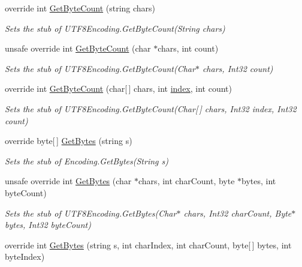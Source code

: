 \begin{DoxyCompactItemize}
override int \hyperlink{class_system_1_1_text_1_1_fakes_1_1_stub_u_t_f8_encoding_acc1ef50c69cc9d464629e328cd5be619}{Get\-Byte\-Count} (string chars)
\begin{DoxyCompactList}\small\item\em Sets the stub of U\-T\-F8\-Encoding.\-Get\-Byte\-Count(\-String chars)\end{DoxyCompactList}\item 
unsafe override int \hyperlink{class_system_1_1_text_1_1_fakes_1_1_stub_u_t_f8_encoding_ab419956e8c4b9d27339d304470aca6c3}{Get\-Byte\-Count} (char $\ast$chars, int count)
\begin{DoxyCompactList}\small\item\em Sets the stub of U\-T\-F8\-Encoding.\-Get\-Byte\-Count(\-Char$\ast$ chars, Int32 count)\end{DoxyCompactList}\item 
override int \hyperlink{class_system_1_1_text_1_1_fakes_1_1_stub_u_t_f8_encoding_a3588dd842f7aef5383732c38241709fd}{Get\-Byte\-Count} (char\mbox{[}$\,$\mbox{]} chars, int \hyperlink{jquery-1_810_82-vsdoc_8js_a75bb12d1f23302a9eea93a6d89d0193e}{index}, int count)
\begin{DoxyCompactList}\small\item\em Sets the stub of U\-T\-F8\-Encoding.\-Get\-Byte\-Count(\-Char\mbox{[}$\,$\mbox{]} chars, Int32 index, Int32 count)\end{DoxyCompactList}\item 
override byte\mbox{[}$\,$\mbox{]} \hyperlink{class_system_1_1_text_1_1_fakes_1_1_stub_u_t_f8_encoding_af7c82dad16ce5d06b27e93c56b20d840}{Get\-Bytes} (string s)
\begin{DoxyCompactList}\small\item\em Sets the stub of Encoding.\-Get\-Bytes(\-String s)\end{DoxyCompactList}\item 
unsafe override int \hyperlink{class_system_1_1_text_1_1_fakes_1_1_stub_u_t_f8_encoding_aab27459e593d68b0ff01a9796c0207bf}{Get\-Bytes} (char $\ast$chars, int char\-Count, byte $\ast$bytes, int byte\-Count)
\begin{DoxyCompactList}\small\item\em Sets the stub of U\-T\-F8\-Encoding.\-Get\-Bytes(\-Char$\ast$ chars, Int32 char\-Count, Byte$\ast$ bytes, Int32 byte\-Count)\end{DoxyCompactList}\item 
override int \hyperlink{class_system_1_1_text_1_1_fakes_1_1_stub_u_t_f8_encoding_acc6bd32983e258781b38911bec5c4277}{Get\-Bytes} (string s, int char\-Index, int char\-Count, byte\mbox{[}$\,$\mbox{]} bytes, int byte\-Index)

\end{DoxyCompactItemize}
